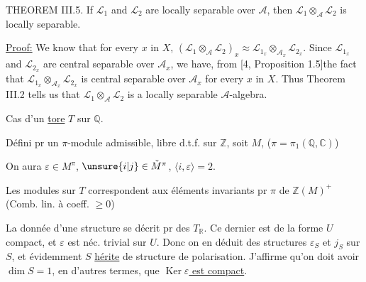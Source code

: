 THEOREM III.5. If $\mathcal L_1$ and $\mathcal L_2$ are locally separable over $\mathcal A$,
then $\mathcal L_1\otimes_{\mathcal A}\mathcal L_2$ is locally separable.

\uline{Proof:} We know that for every $x$ in $X$, $(\mathcal L_1\otimes_{\mathcal A}\mathcal L_2)_x\approx\mathcal L_{1_x}\otimes_{\mathcal A_x}\mathcal L_{2_x}$.
Since $\mathcal L_{1_x}$ and $\mathcal L_{2_x}$ are central separable over $\mathcal A_x$, we have, from
[4, Proposition 1.5]the fact that $\mathcal L_{1_x}\otimes_{\mathcal A_x}\mathcal L_{2_x}$ is central separable over
$\mathcal A_x$ for every $x$ in $X$. Thus Theorem III.2 tells us that $\mathcal L_1\otimes_{\mathcal A}\mathcal L_2$ is a
locally separable $\mathcal A$-algebra.



Cas d'un \uline{tore} $T$ sur $\mathbb Q$.

Défini pr un $\pi$-module admissible, libre d.t.f. sur $\mathbb Z$, soit $M$, ($\pi=\pi_1(\mathbb Q,\mathbb C)$)

On aura $\varepsilon\in M^\pi$, $\unsure{i|j}\in\check M^\pi$, $\langle i,\varepsilon\rangle=2$.

Les modules sur $T$ correspondent aux éléments invariants pr $\pi$ de $\mathbb Z(M)^+$ (Comb. lin. à coeff. $\geq0$)


La donnée d'une structure   se décrit pr des  $T_{\mathbb R}$. Ce dernier est de la forme   $U$ compact,   et $\varepsilon$ est néc. trivial sur $U$. Donc on en déduit des structures $\varepsilon_S$ et $j_S$ sur $S$, et évidemment $S$ \uline{hérite} de structure de polarisation. J'affirme qu'on doit avoir $\dim S=1$, en d'autres termes, que \uline{$\operatorname{Ker}\varepsilon$ est compact}.


